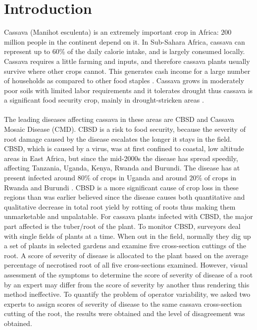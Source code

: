 \documentclass[conference]{IEEEtran}
\begin{document}




%
\IEEEpeerreviewmaketitle



\section{Introduction}
Cassava (Manihot esculenta) is an extremely important crop in Africa: $200$ million people in the continent depend on it. In Sub-Sahara Africa, cassava can represent up to 60\% of the daily calorie intake, and is largely consumed locally. Cassava requires a little farming and inputs, and therefore cassava plants usually survive where other crops cannot. This generates cash income for a large number of households as compared to other food staples \cite{nassar2007cassava}. Cassava grows in moderately poor soils with limited labor requirements and it tolerates drought thus cassava is a significant food security crop, mainly in drought-stricken areas \cite{chavez2005variation}.\\ \\ The leading diseases affecting cassava in these areas are CBSD and Cassava Mosaic Disease (CMD). CBSD is a risk to food security, because the severity of root damage caused by the disease escalates the longer it stays in the field. CBSD, which is caused by a virus, was at first confined to coastal, low altitude areas in East Africa, but since the mid-2000s the disease has spread speedily, affecting Tanzania, Uganda, Kenya, Rwanda and Burundi. The disease has at present infected around $80\%$ of crops in Uganda and around $20\%$ of crops in Rwanda and Burundi \cite{cass}. CBSD is a more significant cause of crop loss in these regions than was earlier believed \cite{ntawuruhunga2007new} since the disease causes both quantitative and qualitative decrease in total root yield by rotting of roots thus making them unmarketable and unpalatable. For cassava plants infected with CBSD, the major part affected is the tuber/root of the plant. To monitor CBSD, surveyors deal with single fields of plants at a time. When out in the field, normally they dig up a set of plants in selected gardens and examine five cross-section cuttings of the root. A score of severity of disease is allocated to the plant based on the average percentage of necrotised root of all five cross-sections examined. However, visual assessment of the symptoms to determine the score of severity of disease of a root by an expert may differ from the score of severity by another thus rendering this method ineffective. To quantify the problem of operator variability, we asked two experts to assign scores of severity of disease to the same cassava cross-section cutting of the root, the results were obtained and the level of disagreement was obtained. 
\end{document}
